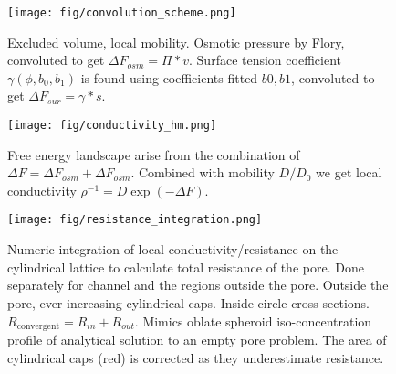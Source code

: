 \documentclass[12pt, a4paper]{article}
\begin{document}
\begin{figure}
    \centering
    \texttt{[image: fig/convolution\_scheme.png]}
    \caption{
        Excluded volume, local mobility. 
        Osmotic pressure by Flory, convoluted to get $\Delta F_{osm} = \Pi \ast v$. Surface tension coefficient $\gamma(\phi, b_0, b_1)$ is found using coefficients fitted $b0, b1$, convoluted to get $\Delta F_{sur} = \gamma \ast s$.
        }
    \label{fig:convolution_scheme}
\end{figure}

\begin{figure}
    \centering
    \texttt{[image: fig/conductivity\_hm.png]}
    \caption{
        Free energy landscape arise from the combination of $\Delta F = \Delta F_{osm} + \Delta F_{osm}$. Combined with mobility $D/D_0$ we get local conductivity $\rho^{-1} = D \exp (-\Delta F)$.
        }
    \label{fig:conductivity_hm}
\end{figure}


\begin{figure}
    \centering
    \texttt{[image: fig/resistance\_integration.png]}
    \caption{
        Numeric integration of local conductivity/resistance on the cylindrical lattice to calculate total resistance of the pore. 
        Done separately for channel and the regions outside the pore.
        Outside the pore, ever increasing cylindrical caps.
        Inside circle cross-sections. $R_{\textrm{convergent}} = R_{in} + R_{out}$.
        Mimics oblate spheroid iso-concentration profile of analytical solution to an empty pore problem.
        The area of cylindrical caps (red) is corrected as they underestimate resistance.
        }
    \label{fig:integration_scheme}
\end{figure}
\end{document}
